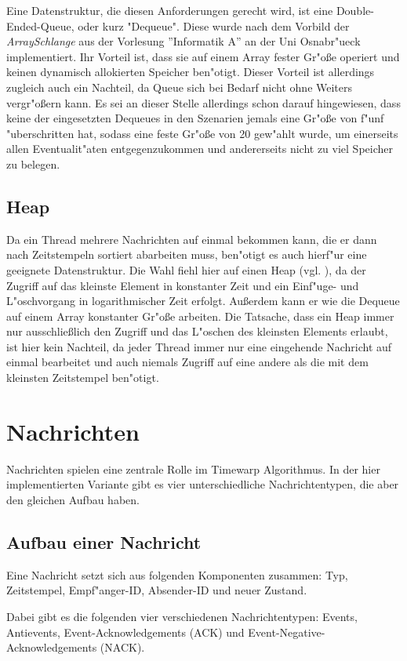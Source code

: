 \documentclass[a4paper, 10pt, openright, parskip, chapterprefix]{scrreprt}
\begin{document}
Eine Datenstruktur, die diesen Anforderungen gerecht wird, ist eine Double-Ended-Queue, oder kurz "Dequeue". Diese wurde
nach dem Vorbild der \emph{ArraySchlange} aus der Vorlesung ''Informatik A'' \cite{...} an der Uni Osnabr"ueck
implementiert. Ihr Vorteil ist, dass sie auf einem Array fester Gr"o\ss e operiert und keinen dynamisch allokierten
Speicher ben"otigt. Dieser Vorteil ist allerdings zugleich auch ein Nachteil, da Queue sich bei Bedarf nicht ohne
Weiters vergr"o\ss ern kann. Es sei an dieser Stelle allerdings schon darauf hingewiesen, dass keine der eingesetzten
Dequeues in den Szenarien jemals eine Gr"o\ss e von f"unf "uberschritten hat, sodass eine feste Gr"o\ss e von 20
gew"ahlt wurde, um einerseits allen Eventualit"aten entgegenzukommen und andererseits nicht zu viel Speicher zu belegen.

\subsection{Heap}
Da ein Thread mehrere Nachrichten auf einmal bekommen kann, die er dann nach Zeitstempeln sortiert abarbeiten muss,
ben"otigt es auch hierf"ur eine geeignete Datenstruktur. Die Wahl fiehl hier auf einen Heap (vgl. \cite{...}), da der
Zugriff auf das kleinste Element in konstanter Zeit und ein Einf"uge- und L"oschvorgang in logarithmischer Zeit erfolgt.
Au\ss erdem kann er wie die Dequeue auf einem Array konstanter Gr"o\ss e arbeiten.
Die Tatsache, dass ein Heap immer nur ausschlie\ss lich den Zugriff und das L"oschen des kleinsten Elements erlaubt, ist
hier kein Nachteil, da jeder Thread immer nur eine eingehende Nachricht auf einmal bearbeitet und auch niemals Zugriff auf eine
andere als die mit dem kleinsten Zeitstempel ben"otigt.

\section{Nachrichten}
Nachrichten spielen eine zentrale Rolle im Timewarp Algorithmus. In der hier implementierten Variante gibt es vier
unterschiedliche Nachrichtentypen, die aber den gleichen Aufbau haben.
\subsection{Aufbau einer Nachricht}
Eine Nachricht setzt sich aus folgenden Komponenten zusammen: Typ, Zeitstempel, Empf"anger-ID, Absender-ID und neuer
Zustand.

Dabei gibt es die folgenden vier verschiedenen Nachrichtentypen:
Events, Antievents, Event-Acknowledgements (ACK) und Event-Negative-Acknowledgements (NACK).
\end{document}
